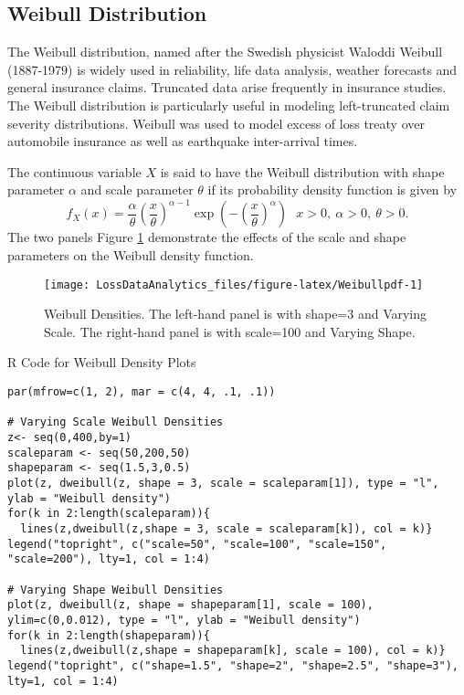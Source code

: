 \documentclass[]{book}
\theoremstyle{definition}
\theoremstyle{definition}
\theoremstyle{definition}
\theoremstyle{remark}
\begin{document}
\subsection{Weibull Distribution}\label{weibull-distribution}

The Weibull distribution, named after the Swedish physicist Waloddi
Weibull (1887-1979) is widely used in reliability, life data analysis,
weather forecasts and general insurance claims. Truncated data arise
frequently in insurance studies. The Weibull distribution is
particularly useful in modeling left-truncated claim severity
distributions. Weibull was used to model excess of loss treaty over
automobile insurance as well as earthquake inter-arrival times.

The continuous variable \(X\) is said to have the Weibull distribution
with shape parameter \(\alpha\) and scale parameter \(\theta\) if its
probability density function is given by
\[f_{X}\left( x \right) = \frac{\alpha}{\theta}\left( \frac{x}{\theta} \right)^{\alpha - 1} \exp \left(- \left( \frac{x}{\theta} \right)^{\alpha}\right) \ \ \ x > 0,\ \alpha > 0,\ \theta > 0.\]
The two panels Figure \ref{fig:Weibullpdf} demonstrate the effects of
the scale and shape parameters on the Weibull density function.

\begin{figure}

{\centering \texttt{[image: LossDataAnalytics\_files/figure-latex/Weibullpdf-1]} 

}

\caption{Weibull Densities. The left-hand panel is with shape=3 and Varying Scale. The right-hand panel is with scale=100 and Varying Shape.}\label{fig:Weibullpdf}
\end{figure}

R Code for Weibull Density Plots

\hypertarget{display.ux20Weibullscale.2}{}
\begin{verbatim}
par(mfrow=c(1, 2), mar = c(4, 4, .1, .1))

# Varying Scale Weibull Densities
z<- seq(0,400,by=1)
scaleparam <- seq(50,200,50)
shapeparam <- seq(1.5,3,0.5)
plot(z, dweibull(z, shape = 3, scale = scaleparam[1]), type = "l", ylab = "Weibull density")
for(k in 2:length(scaleparam)){
  lines(z,dweibull(z,shape = 3, scale = scaleparam[k]), col = k)}
legend("topright", c("scale=50", "scale=100", "scale=150", "scale=200"), lty=1, col = 1:4)

# Varying Shape Weibull Densities
plot(z, dweibull(z, shape = shapeparam[1], scale = 100), ylim=c(0,0.012), type = "l", ylab = "Weibull density")
for(k in 2:length(shapeparam)){
  lines(z,dweibull(z,shape = shapeparam[k], scale = 100), col = k)}
legend("topright", c("shape=1.5", "shape=2", "shape=2.5", "shape=3"), lty=1, col = 1:4)
\end{verbatim}
\end{document}

